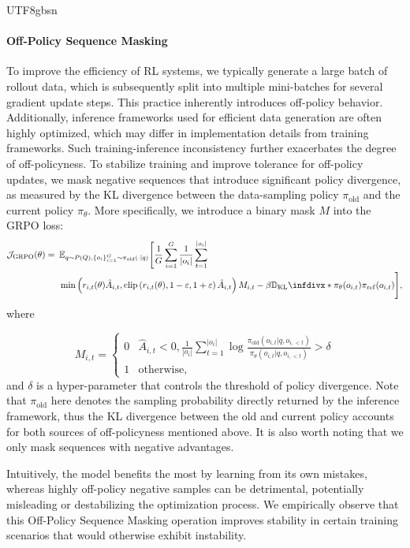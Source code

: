 \documentclass[11pt, a4paper, logo, copyright, nonumbering]{deepseek}
\newcommand{\Dkl}{\mathbb{D}_{\mathrm{KL}}\infdivx*}
\newcommand{\Jgrpo}{\mathcal{J}_{\mathrm{GRPO}}}
\newcommand{\piold}{\pi_{\mathrm{old}}}
\newcommand{\piref}{\pi_{\mathrm{ref}}}
\begin{document}
\begin{CJK*}{UTF8}{gbsn}
\paragraph{Off-Policy Sequence Masking} To improve the efficiency of RL systems, we typically generate a large batch of rollout data, which is subsequently split into multiple mini-batches for several gradient update steps. This practice inherently introduces off-policy behavior. Additionally, inference frameworks used for efficient data generation are often highly optimized, which may differ in implementation details from training frameworks. Such training-inference inconsistency further exacerbates the degree of off-policyness. To stabilize training and improve tolerance for off-policy updates, we mask negative sequences that introduce significant policy divergence, as measured by the KL divergence between the data-sampling policy $\piold$ and the current policy $\pi_\theta$. More specifically, we introduce a binary mask $M$ into the GRPO loss:
\begin{align}
    \Jgrpo(\theta)=\enspace& \mathbb{E}_{
        q\sim P(Q), 
        \{o_i\}_{i=1}^G\sim \piold(\cdot|q)}\Bigg[
            \frac{1}{G}\sum_{i=1}^G\frac{1}{|o_i|}\sum_{t=1}^{|o_i|} \nonumber\\
            &\min\left(
                r_{i,t}(\theta) \hat{A}_{i,t}, 
                \text{clip}\left(r_{i,t}(\theta), 1-\varepsilon, 1+\varepsilon\right)\hat{A}_{i,t}
            \right)M_{i,t} - \beta \Dkl{\pi_\theta(o_{i,t})}{\piref(o_{i,t})}
        \Bigg],
\end{align}
where

\begin{equation}
M_{i,t} = \begin{cases}
0 & {\hat{A}_{i,t} < 0, \frac{1}{|o_i|}\sum_{t=1}^{|o_i|}\log\frac{\piold(o_{i,t}|q,o_{i,<t})}{\pi_{\theta}(o_{i,t}|q,o_{i,<t})} > \delta} \\[1ex]
1 & {\text{otherwise},}
\end{cases}
\end{equation}
and $\delta$ is a hyper-parameter that controls the threshold of policy divergence. Note that $\piold$ here denotes the sampling probability directly returned by the inference framework, thus the KL divergence between the old and current policy accounts for both sources of off-policyness mentioned above. It is also worth noting that we only mask sequences with negative advantages. 

Intuitively, the model benefits the most by learning from its own mistakes, whereas highly off-policy negative samples can be detrimental, potentially misleading or destabilizing the optimization process. We empirically observe that this Off-Policy Sequence Masking operation improves stability in certain training scenarios that would otherwise exhibit instability.


\end{CJK*}
\end{document}
